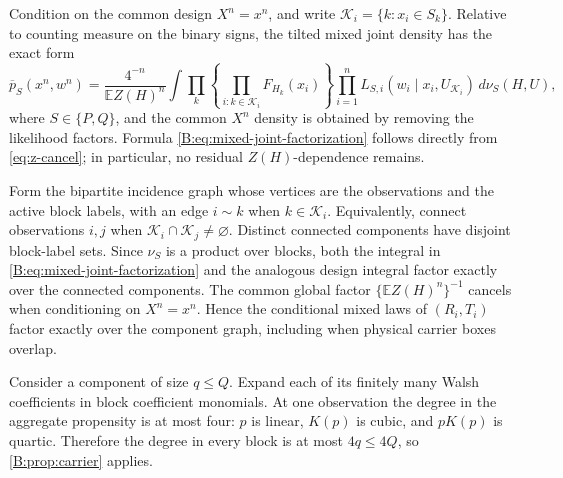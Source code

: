 \documentclass[11pt]{article}
\newcommand{\E}{\mathbb{E}}
\begin{document}
Condition on the common design \(X^n=x^n\), and write
\(\mathcal K_i=\{k:x_i\in S_k\}\).  Relative to counting measure on the
binary signs, the tilted mixed joint density has the exact form
\begin{equation}
 \overline p_S(x^n,w^n)
 =\frac{4^{-n}}{\E Z(H)^n}
  \int
  \prod_k\left\{\prod_{i:k\in\mathcal K_i}F_{H_k}(x_i)\right\}
  \prod_{i=1}^nL_{S,i}(w_i\mid x_i,U_{\mathcal K_i})
  \,d\nu_S(H,U),
 \label{B:eq:mixed-joint-factorization}
\end{equation}
where \(S\in\{P,Q\}\), and the common \(X^n\) density is obtained by
removing the likelihood factors.  Formula
\eqref{B:eq:mixed-joint-factorization} follows directly from
\eqref{eq:z-cancel}; in particular, no residual \(Z(H)\)-dependence remains.

Form the bipartite incidence graph whose vertices are the observations and
the active block labels, with an edge \(i\sim k\) when
\(k\in\mathcal K_i\).  Equivalently, connect observations \(i,j\) when
\(\mathcal K_i\cap\mathcal K_j\ne\varnothing\).  Distinct connected
components have disjoint block-label sets.  Since \(\nu_S\) is a product
over blocks, both the integral in \eqref{B:eq:mixed-joint-factorization} and
the analogous design integral factor exactly over the connected components.
The common global factor \(\{\E Z(H)^n\}^{-1}\) cancels when conditioning on
\(X^n=x^n\).  Hence the conditional mixed laws of \((R_i,T_i)\) factor
exactly over the component graph, including when physical carrier boxes
overlap.

Consider a component of size \(q\le Q\).  Expand each of its finitely many
Walsh coefficients in block coefficient monomials.  At one observation the
degree in the aggregate propensity is at most four: \(p\) is linear,
\(K(p)\) is cubic, and \(pK(p)\) is quartic.  Therefore the degree in every
block is at most \(4q\le4Q\), so \cref{B:prop:carrier} applies.
\end{document}
